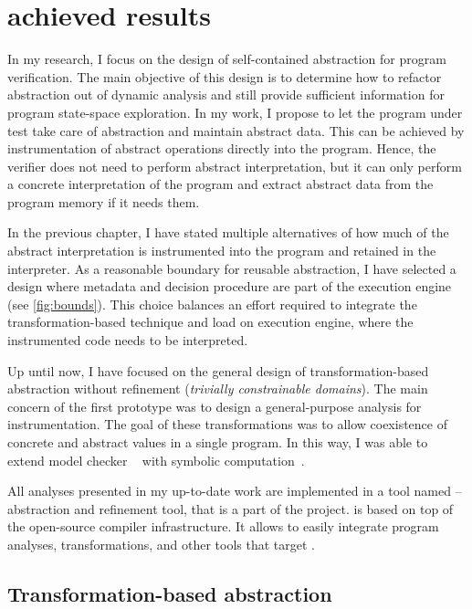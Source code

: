 \chapter{achieved results}
\label{ch:results}


In my research, I focus on the design of self-contained abstraction for program
verification. The main objective of this design is to determine how to refactor
abstraction out of dynamic analysis and still provide sufficient information
for program state-space exploration. In my work, I propose to let the program
under test take care of abstraction and maintain abstract data. This can be
achieved by instrumentation of abstract operations directly into the program.
Hence, the verifier does not need to perform abstract interpretation, but it
can only perform a concrete interpretation of the program and extract abstract
data from the program memory if it needs them.

In the previous chapter, I have stated multiple alternatives of how much of the
abstract interpretation is instrumented into the program and retained in the
interpreter.  As a reasonable boundary for reusable abstraction, I have
selected a design where metadata and decision procedure are part of the
execution engine (see \autoref{fig:bounds}). This choice balances an effort
required to integrate the transformation-based technique and load on execution
engine, where the instrumented code needs to be interpreted.

Up until now, I have focused on the general design of trans\-for\-mation-based
abstraction without refinement (\emph{trivially constrainable domains}). The
main concern of the first prototype was to design a general-purpose analysis
for instrumentation. The goal of these transformations was to allow coexistence
of concrete and abstract values in a single program. In this way, I was able to
extend model checker \divine~\cite{Divine17} with symbolic
computation~\cite{Lauko2019Sym, Lauko2018SymComp}.

All analyses presented in my up-to-date work are implemented in a tool named
\lart{} -- \llvm abstraction and refinement tool, that is a part of the \divine
project. \lart is based on top of the open-source \llvm compiler
infrastructure. It allows \lart to easily integrate program analyses,
transformations, and other tools that target \llvm.

\section{Transformation-based abstraction}
\label{sec:symbolic}

